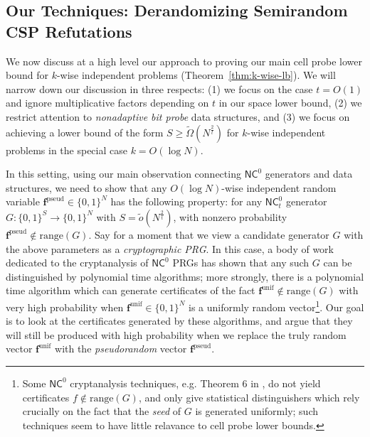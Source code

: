 \documentclass[11pt]{article}
\newcommand{\B}{\{0,1\}}
\newcommand{\rng}{\mathrm{range}}
\begin{document}
\subsection{Our Techniques: Derandomizing Semirandom CSP Refutations}\label{subsec:techniques}

We now discuss at a high level our approach to proving our main cell probe lower bound for $k$-wise independent problems (Theorem~\ref{thm:k-wise-lb}). We will narrow down our discussion in three respects: (1) we focus on the case $t= O(1)$ and ignore multiplicative factors depending on $t$ in our space lower bound, (2) we restrict attention to \emph{nonadaptive bit probe} data structures, and (3) we focus on achieving a lower bound of the form $S \geq \tilde{\Omega}(N^{\frac{2}{t}})$ for $k$-wise independent problems in the special case $k = O(\log N)$.

In this setting, using our main observation connecting $\mathsf{NC}^0$ generators and data structures, we need to show that any $O(\log N)$-wise independent random variable $\bm{f}^{\mathrm{pseud}}\in \B^N$ has the following property: for any $\mathsf{NC}^0_t$ generator $G: \B^S \to \B^N$ with $S =\tilde{o}(N^{\frac{2}{t}})$, with nonzero probability $\bm{f}^{\mathrm{pseud}}\notin \rng(G)$. Say for a moment that we view a candidate generator $G$ with the above parameters as a \emph{cryptographic PRG}. In this case, a body of work dedicated to the cryptanalysis of $\mathsf{NC}^0$ PRGs has shown that any such $G$ can be distinguished by polynomial time algorithms; more strongly, there is a polynomial time algorithm which can generate certificates of the fact $\bm{f}^{\mathrm{unif}}\notin \rng(G)$ with very high probability when $\bm{f}^{\mathrm{unif}}\in \B^N$ is a uniformly random vector\footnote{Some $\mathsf{NC}^0$ cryptanalysis techniques, e.g. Theorem 6 in \cite{mossel-epsilon}, do not yield certificates $f \notin \rng(G)$, and only give statistical distinguishers which rely crucially on the fact that the \emph{seed} of $G$ is generated uniformly; such techniques seem to have little relavance to cell probe lower bounds.}. Our goal is to look at the certificates generated by these algorithms, and argue that they will still be produced with high probability when we replace the truly random vector $\bm{f}^{\mathrm{unif}}$ with the \emph{pseudorandom} vector $\bm{f}^{\mathrm{pseud}}$.
\end{document}
